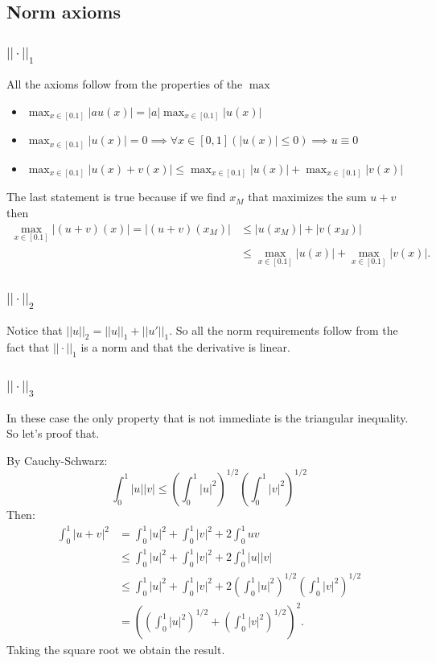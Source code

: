 \documentclass{article}
\begin{document}
\subsection*{Norm axioms}
\subsubsection*{$||\cdot||_1$}
All the axioms follow from the properties of the $\max$
\begin{itemize}
\item $\max_{x\in[0.1]}|au(x)|=|a|\max_{x\in[0.1]}|u(x)|$
\item $\max_{x\in[0.1]}|u(x)|=0 \implies \forall x \in [0,1] (|u(x)|\leq 0) \implies u\equiv0$
\item $\max_{x\in[0.1]}|u(x)+v(x)| \leq \max_{x\in[0.1]}|u(x)|+\max_{x\in[0.1]}|v(x)|$
\end{itemize}
The last statement is true because if we find $x_M$ that maximizes the sum $u+v$
then 
\begin{align*}
\max_{x\in[0.1]}|(u+v)(x)|= |(u+v)(x_M)|&\leq|u(x_M)|+|v(x_M)|\\
					&\leq\max_{x\in[0.1]}|u(x)|+\max_{x\in[0.1]}|v(x)|.
\end{align*}
\subsubsection*{$||\cdot||_2$}
Notice that $||u||_2=||u||_1+||u'||_1$. So all the norm requirements follow
from the fact that $||\cdot||_1$ is a norm and that the derivative is linear.
\subsubsection*{$||\cdot||_3$}
In these case the only property that is not immediate is the triangular
inequality. So let's proof that.

By Cauchy-Schwarz:
\[
	\int_0^1|u||v|\leq \left( \int_0^1|u|^2\right)^{1/2} 
	\left(\int_0^1|v|^2\right)^{1/2}
\]
Then:
\begin{align*}
	\int_0^1|u+v|^2&=\int_0^1|u|^2+\int_0^1|v|^2+2\int_0^1uv\\
		&\leq\int_0^1|u|^2+\int_0^1|v|^2+2\int_0^1|u||v|\\
		&\leq\int_0^1|u|^2+\int_0^1|v|^2+2\left(
		\int_0^1|u|^2\right)^{1/2}\left(\int_0^1|v|^2\right)^{1/2}\\
		&=\left(\left(\int_0^1|u|^2\right)^{1/2}+\left(\int_0^1|v|^2\right)^{1/2}\right)^2.
\end{align*}
Taking the square root we obtain the result.
\end{document}
